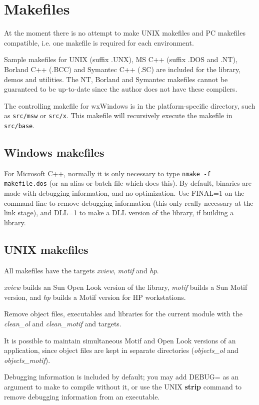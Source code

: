 \section{Makefiles}

At the moment there is no attempt to make UNIX makefiles and
PC makefiles compatible, i.e. one makefile is required for
each environment.

Sample makefiles for UNIX (suffix .UNX), MS C++ (suffix .DOS and .NT), Borland
C++ (.BCC) and Symantec C++ (.SC) are included for the library, demos
and utilities. The NT, Borland and Symantec makefiles cannot be
guaranteed to be up-to-date since the author does not have
these compilers.

The controlling makefile for wxWindows is in the platform-specific
directory, such as {\tt src/msw} or {\tt src/x}. This makefile will
recursively execute the makefile in {\tt src/base}.

\subsection{Windows makefiles}

For Microsoft C++, normally it is only necessary to type {\tt nmake -f
makefile.dos} (or an alias or batch file which does this). By default,
binaries are made with debugging information, and no optimization. Use
FINAL=1 on the command line to remove debugging information (this only
really necessary at the link stage), and DLL=1 to make a DLL version of
the library, if building a library.

\subsection{UNIX makefiles}

All makefiles have the targets {\it xview}, {\it motif} and {\it hp}.

{\it xview} builds an Sun Open Look version of the library, {\it motif}
builds a Sun Motif version, and {\it hp} builds a Motif version for HP
workstations.

Remove object files, executables and libraries for the
current module with the {\it clean\_ol} and {\it clean\_motif} and
 targets.

It is possible to maintain simultaneous Motif and Open Look versions
of an application, since object files are kept in separate directories
({\it objects\_ol} and {\it objects\_motif}).

Debugging information is included by default; you may add DEBUG= as an
argument to make to compile without it, or use the UNIX {\bf strip}
command to remove debugging information from an executable.

